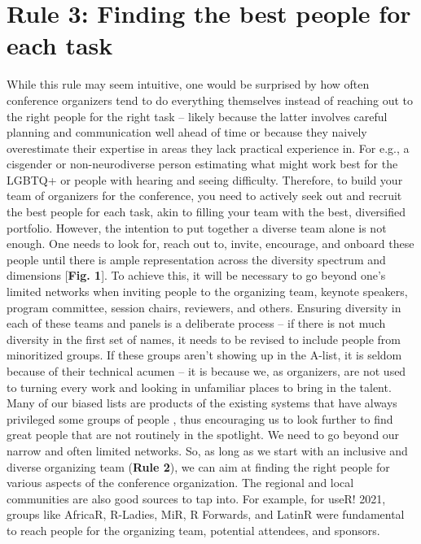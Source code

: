 \documentclass[10pt,letterpaper]{article}
\begin{document}
\section*{Rule 3: Finding the best people for each task}

While this rule may seem intuitive, one would be surprised by how often conference organizers tend to do everything themselves instead of reaching out to the right people for the right task -- likely because the latter involves careful planning and communication well ahead of time or because they naively overestimate their expertise in areas they lack practical experience in. For e.g., a cisgender or non-neurodiverse person estimating what might work best for the LGBTQ+ or people with hearing and seeing difficulty. 
Therefore, to build your team of organizers for the conference, you need to actively seek out and recruit the best people for each task, akin to filling your team with the best, diversified portfolio. However, the intention to put together a diverse team alone is not enough. One needs to look for, reach out to, invite, encourage, and onboard these people until there is ample representation across the diversity spectrum and dimensions [\textbf{Fig. 1}]. To achieve this, it will be necessary to go beyond one's limited networks when inviting people to the organizing team, keynote speakers, program committee, session chairs, reviewers, and others. Ensuring diversity in each of these teams and panels is a deliberate process -- if there is not much diversity in the first set of names, it needs to be revised to include people from minoritized groups. If these groups aren't showing up in the A-list, it is seldom because of their technical acumen -- it is because we, as organizers, are not used to turning every work and looking in unfamiliar places to bring in the talent.  Many of our biased lists are products of the existing systems that have always privileged some groups of people \cite{dwyer_notice_2021, sarabipour_evaluating_2020}, thus encouraging us to look further to find great people that are not routinely in the spotlight. We need to go beyond our narrow and often limited networks. So, as long as we start with an inclusive and diverse organizing team (\textbf{Rule 2}), we can aim at finding the right people for various aspects of the conference organization. The regional and local communities are also good sources to tap into. For example, for useR! 2021, groups like AfricaR, R-Ladies, MiR, R Forwards, and LatinR were fundamental to reach people for the organizing team, potential attendees, and sponsors.
\end{document}
